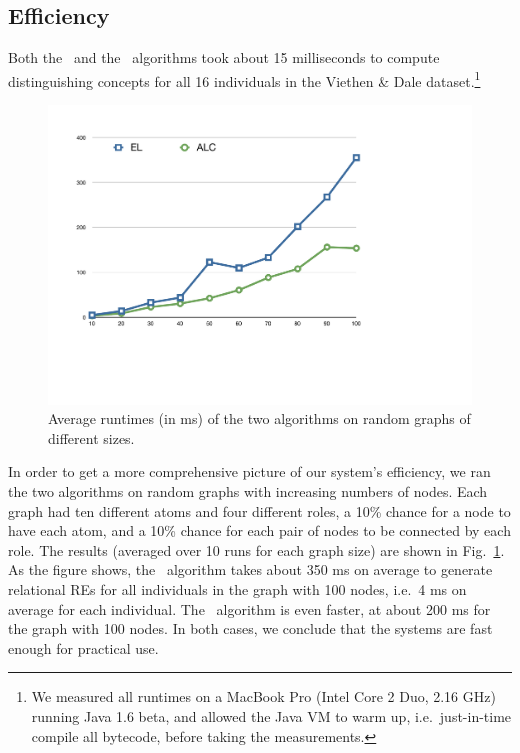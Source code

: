 



\subsection{Efficiency}

Both the \el\ and the \alc\ algorithms took about 15 milliseconds to
compute distinguishing concepts for all 16 individuals in the Viethen
\& Dale dataset.\footnote{We measured all runtimes on a MacBook Pro
  (Intel Core 2 Duo, 2.16 GHz) running Java 1.6 beta, and allowed the
  Java VM to warm up, i.e.\ just-in-time compile all bytecode, before
  taking the measurements.}

\begin{figure}
  \centering
  \includegraphics[width=\columnwidth]{runtimes}
  \caption{Average runtimes (in ms) of the two algorithms on random graphs of
    different sizes.} 
  \label{fig:runtimes}
\end{figure}

In order to get a more comprehensive picture of our system's
efficiency, we ran the two algorithms on random graphs with increasing
numbers of nodes.   Each graph had ten different atoms and four
different roles, a 10\% chance for a node to have each atom, and a
10\% chance for each pair of nodes to be connected by each role.  The
results (averaged over 10 runs for each graph size) are shown in
Fig.~\ref{fig:runtimes}.  As the figure shows, the \el\ algorithm
takes about 350 ms on average to generate relational REs for all
individuals in the graph with 100 nodes, i.e.\ 4 ms on average for
each individual.  The \alc\ algorithm is even faster, at about 200 ms
for the graph with 100 nodes.  In both cases, we conclude that the
systems are fast enough for practical use.



